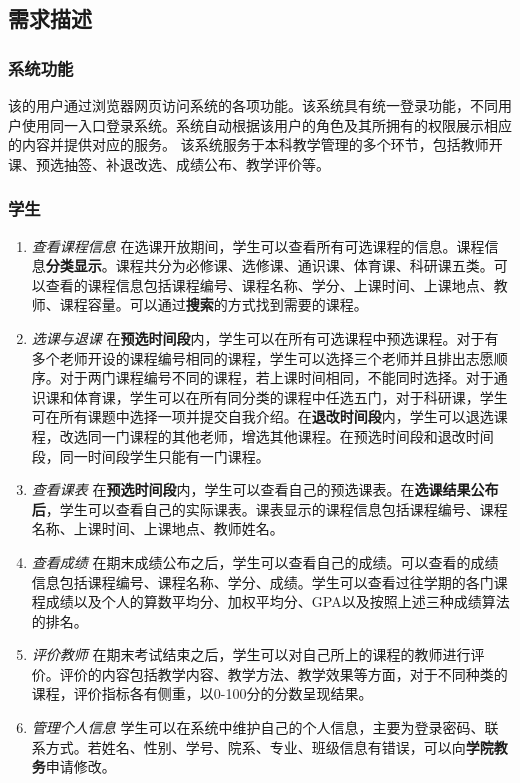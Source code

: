 \subsection{需求描述}

\subsubsection{系统功能}
\ttfamily
该的用户通过浏览器{\sffamily 网页}访问系统的各项功能。该系统具有{\sffamily 统一登录}功能，不同用户使用同一入口登录系统。系统自动根据该用户的角色及其所拥有的权限展示相应的内容并提供对应的服务。
该系统服务于本科教学管理的多个环节，包括教师开课、预选抽签、补退改选、成绩公布、教学评价等。

\normalfont

\subsubsection{学生}
\begin{enumerate}
    \item \textit{查看课程信息} \quad 在选课开放期间，学生可以查看所有可选课程的信息。课程信息\textbf{分类显示}。课程共分为必修课、选修课、通识课、体育课、科研课五类。可以查看的课程信息包括课程编号、课程名称、学分、上课时间、上课地点、教师、课程容量。可以通过\textbf{搜索}的方式找到需要的课程。
    \item \textit{选课与退课} \quad 在\textbf{预选时间段}内，学生可以在所有可选课程中预选课程。对于有多个老师开设的课程编号相同的课程，学生可以选择三个老师并且排出志愿顺序。对于两门课程编号不同的课程，若上课时间相同，不能同时选择。对于通识课和体育课，学生可以在所有同分类的课程中任选五门，对于科研课，学生可在所有课题中选择一项并提交自我介绍。在\textbf{退改时间段}内，学生可以退选课程，改选同一门课程的其他老师，增选其他课程。在预选时间段和退改时间段，同一时间段学生只能有一门课程。
    \item \textit{查看课表} \quad 在\textbf{预选时间段}内，学生可以查看自己的预选课表。在\textbf{选课结果公布后}，学生可以查看自己的实际课表。课表显示的课程信息包括课程编号、课程名称、上课时间、上课地点、教师姓名。
    \item \textit{查看成绩} \quad 在期末成绩公布之后，学生可以查看自己的成绩。可以查看的成绩信息包括课程编号、课程名称、学分、成绩。学生可以查看过往学期的各门课程成绩以及个人的算数平均分、加权平均分、GPA以及按照上述三种成绩算法的排名。
    \item \textit{评价教师} \quad 在期末考试结束之后，学生可以对自己所上的课程的教师进行评价。评价的内容包括教学内容、教学方法、教学效果等方面，对于不同种类的课程，评价指标各有侧重，以0-100分的分数呈现结果。
    \item \textit{管理个人信息} \quad 学生可以在系统中维护自己的个人信息，主要为登录密码、联系方式。若姓名、性别、学号、院系、专业、班级信息有错误，可以向\textbf{学院教务}申请修改。
\end{enumerate}

